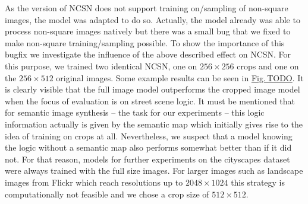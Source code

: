 As the version of NCSN \cite{score_3} does not support training on/sampling of non-square images, the model was adapted to do so. Actually, the model already was able to process non-square images natively but there was a small bug that we fixed to make non-square training/sampling possible. To show the importance of this bugfix we investigate the influence of the above described effect on NCSN. For this purpose, we trained two identical NCSN, one on $256\times256$ crops and one on the $256\times512$ original images. Some example results can be seen in \hyperref[fig:]{Fig.\,TODO}. It is clearly visible that the full image model outperforms the cropped image model when the focus of evaluation is on street scene logic. It must be mentioned that for semantic image synthesis – the task for our experiments – this logic information actually is given by the semantic map which initially gives rise to the idea of training on crops at all. Nevertheless, we suspect that a model knowing the logic without a semantic map also performs somewhat better than if it did not. For that reason, models for further experiments on the cityscapes dataset were always trained with the full size images. For larger images such as landscape images from Flickr which reach resolutions up to $2048\times1024$ this strategy is computationally not feasible and we chose a crop size of $512\times512$.
